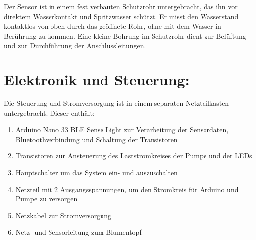 Der Sensor ist in einem fest verbauten Schutzrohr untergebracht, das ihn vor direktem Wasserkontakt und Spritzwasser schützt. Er misst den Wasserstand kontaktlos von oben durch das geöffnete Rohr, ohne mit dem Wasser in Berührung zu kommen. Eine kleine Bohrung im Schutzrohr dient zur Belüftung und zur Durchführung der Anschlussleitungen.

\section{Elektronik und Steuerung:}
Die Steuerung und Stromversorgung ist in einem separaten Netzteilkasten untergebracht. Dieser enthält:
\begin{enumerate}
	\item Arduino Nano 33 BLE Sense Light zur Verarbeitung der Sensordaten, Bluetoothverbindung und Schaltung der Transistoren
	\item Transistoren zur Ansteuerung des Laststromkreises der Pumpe und der LEDs
	\item Hauptschalter um das System ein- und auszuschalten
	\item Netzteil mit 2 Ausgangsspannungen, um den Stromkreis für Arduino und Pumpe zu versorgen
	\item Netzkabel zur Stromversorgung
	\item Netz- und Sensorleitung zum Blumentopf
\end{enumerate}
